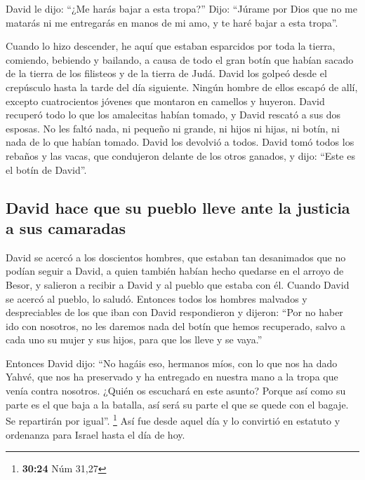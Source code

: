 \begin{paracol}{2}
 David le dijo: ``¿Me harás bajar a esta tropa?'' Dijo:
``Júrame por Dios que no me matarás ni me entregarás en manos de mi amo,
y te haré bajar a esta tropa''.

 Cuando lo hizo descender, he aquí que estaban esparcidos
por toda la tierra, comiendo, bebiendo y bailando, a causa de todo el
gran botín que habían sacado de la tierra de los filisteos y de la
tierra de Judá.  David los golpeó desde el crepúsculo
hasta la tarde del día siguiente. Ningún hombre de ellos escapó de allí,
excepto cuatrocientos jóvenes que montaron en camellos y huyeron.
 David recuperó todo lo que los amalecitas habían tomado,
y David rescató a sus dos esposas.  No les faltó nada, ni
pequeño ni grande, ni hijos ni hijas, ni botín, ni nada de lo que habían
tomado. David los devolvió a todos.  David tomó todos los
rebaños y las vacas, que condujeron delante de los otros ganados, y
dijo: ``Este es el botín de David''.

\hypertarget{david-hace-que-su-pueblo-lleve-ante-la-justicia-a-sus-camaradas}{%
\subsection{David hace que su pueblo lleve ante la justicia a sus
camaradas}\label{david-hace-que-su-pueblo-lleve-ante-la-justicia-a-sus-camaradas}}

 David se acercó a los doscientos hombres, que estaban
tan desanimados que no podían seguir a David, a quien también habían
hecho quedarse en el arroyo de Besor, y salieron a recibir a David y al
pueblo que estaba con él. Cuando David se acercó al pueblo, lo saludó.
 Entonces todos los hombres malvados y despreciables de
los que iban con David respondieron y dijeron: ``Por no haber ido con
nosotros, no les daremos nada del botín que hemos recuperado, salvo a
cada uno su mujer y sus hijos, para que los lleve y se vaya.''

 Entonces David dijo: ``No hagáis eso, hermanos míos, con
lo que nos ha dado Yahvé, que nos ha preservado y ha entregado en
nuestra mano a la tropa que venía contra nosotros. 
¿Quién os escuchará en este asunto? Porque así como su parte es el que
baja a la batalla, así será su parte el que se quede con el bagaje. Se
repartirán por igual''. \footnote{\textbf{30:24} Núm 31,27}
 Así fue desde aquel día y lo convirtió en estatuto y
ordenanza para Israel hasta el día de hoy.


\end{paracol}
